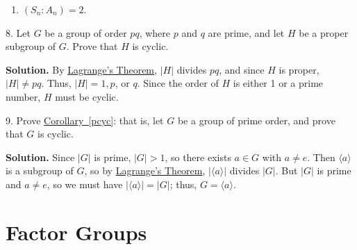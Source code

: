 \documentclass[10pt,]{book}
\theoremstyle{plain}
\theoremstyle{definition}
\theoremstyle{definition}
\theoremstyle{definition}
\theoremstyle{definition}
\numberwithin{equation}{section}
\begin{document}
\begin{exerciselist}
\begin{enumerate}[label=(\alph*)]
\item\hypertarget{li-487}{}\((S_n:A_n)=2\).%
\end{enumerate}
\item[8.]\hypertarget{exercise-57}{}Let \(G\) be a group of order \(pq\), where \(p\) and \(q\) are prime, and let \(H\) be a proper subgroup of \(G\). Prove that \(H\) is cyclic.%
\par\smallskip
\par\smallskip
\noindent\textbf{Solution.}\hypertarget{solution-57}{}\quad
By \hyperref[lagrange]{Lagrange's Theorem}, \(|H|\) divides \(pq\), and since \(H\) is proper, \(|H|\neq  pq\). Thus, \(|H|=1,p\), or \(q\). Since the order of \(H\) is either 1 or a prime number, \(H\) must be cyclic.%
\item[9.]\hypertarget{exercise-58}{}Prove \hyperref[pcyc]{Corollary~\ref{pcyc}}: that is, let \(G\) be a group of prime order, and prove that \(G\) is cyclic.%
\par\smallskip
\par\smallskip
\noindent\textbf{Solution.}\hypertarget{solution-58}{}\quad
Since \(|G|\) is prime, \(|G|>1\), so there exists \(a\in G\) with \(a\neq e\). Then \(\langle a\rangle\) is a subgroup of \(G\), so by \hyperref[lagrange]{Lagrange's Theorem}, \(|\langle a\rangle |\) divides \(|G|\). But \(|G|\) is prime and \(a\neq e\), so we must have \(|\langle a\rangle |=|G|\); thus, \(G=\langle a\rangle\).%
\end{exerciselist}
\typeout{************************************************}
\typeout{************************************************}
\chapter[{Factor Groups}]{Factor Groups}\label{factorgps}
\typeout{************************************************}
\typeout{************************************************}
\end{document}
